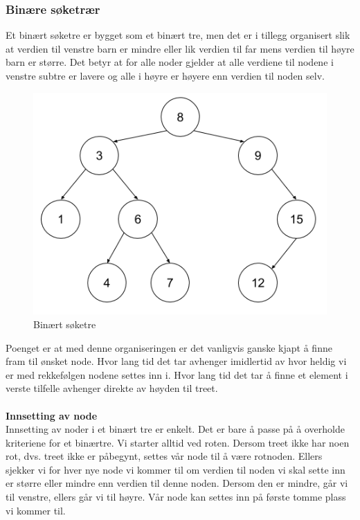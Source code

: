 \subsubsection{Binære søketrær}
Et binært søketre er bygget som et binært tre, men det er i tillegg organisert slik at verdien til venstre barn er mindre eller lik verdien til far mens verdien til høyre barn er større. Det betyr at for alle noder gjelder at alle verdiene til nodene i venstre subtre er lavere og alle i høyre er høyere enn verdien til noden selv. 

\begin{figure}[H]
\includegraphics[scale=0.6]{images/binaeresoeketraer}
\centering %
\caption{Binært søketre}
\label{fig:binaeresoeketraer}
\end{figure}

\noindent Poenget er at med denne organiseringen er det vanligvis ganske kjapt å finne fram til ønsket node. Hvor lang tid det tar avhenger imidlertid av hvor heldig vi er med rekkefølgen nodene settes inn i. Hvor lang tid det tar å finne et element i verste tilfelle avhenger direkte av høyden til treet.
\\\\
\textbf{Innsetting av node}\\
Innsetting av noder i et binært tre er enkelt. Det er bare å passe på å overholde kriteriene for et binærtre. Vi starter alltid ved roten. Dersom treet ikke har noen rot, dvs. treet ikke er påbegynt, settes vår node til å være rotnoden. Ellers sjekker vi for hver nye node vi kommer til om verdien til noden vi skal sette inn er større eller mindre enn verdien til denne noden. Dersom den er mindre, går vi til venstre, ellers går vi til høyre. Vår node kan settes inn på første tomme plass vi kommer til.

